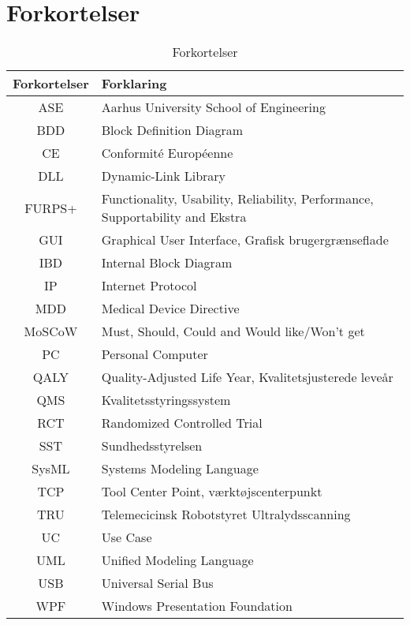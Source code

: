 \chapter{Forkortelser}

\begin{table}[htb]
\centering
\begin{tabular}{ | c | p{} | }
\hline
\textbf{Forkortelser} & \textbf{Forklaring} \\\hline
ASE & Aarhus University School of Engineering \\\hline
BDD & Block Definition Diagram \\\hline
CE & Conformité Européenne\\\hline
DLL & Dynamic-Link Library \\\hline
FURPS+ & Functionality, Usability, Reliability, Performance, Supportability and Ekstra \\\hline
GUI & Graphical User Interface, Grafisk brugergrænseflade \\\hline
IBD & Internal Block Diagram \\\hline
IP & Internet Protocol \\\hline
MDD & Medical Device Directive \\\hline
MoSCoW & Must, Should, Could and Would like/Won't get\\\hline
PC & Personal Computer \\\hline
QALY & Quality-Adjusted Life Year, Kvalitetsjusterede leveår  \\\hline
QMS & Kvalitetsstyringssystem \\\hline
RCT & Randomized Controlled Trial \\\hline
SST & Sundhedsstyrelsen \\\hline
SysML & Systems Modeling Language \\\hline
TCP & Tool Center Point, værktøjscenterpunkt \\\hline
TRU & Telemecicinsk Robotstyret Ultralydsscanning \\\hline
UC & Use Case \\\hline
UML & Unified Modeling Language \\\hline
USB & Universal Serial Bus \\\hline
WPF & Windows Presentation Foundation \\\hline

\end{tabular}
\caption{Forkortelser}
\end{table}

\vspace{3cm}